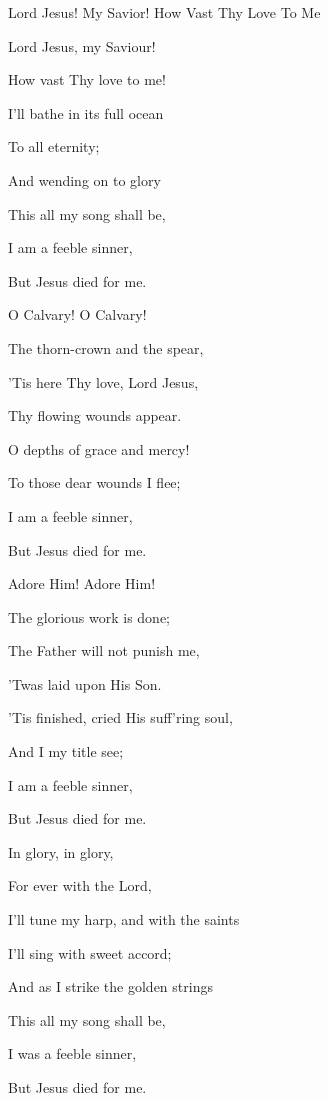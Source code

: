 \documentclass[12pt]{book}
\begin{document}
\begin{song}{Lord Jesus! My Savior! How Vast Thy Love To Me}{}
  {\SBPubDom}
  {}
  {}
  {}

  \begin{SBVerse}
    Lord Jesus, my Saviour!

    How vast Thy love to me!

    I'll bathe in its full ocean

    To all eternity;

    And wending on to glory

    This all my song shall be,

    I am a feeble sinner,

    But Jesus died for me.
  \end{SBVerse}

  \begin{SBVerse}
    O Calvary! O Calvary!

    The thorn-crown and the spear,

    'Tis here Thy love, Lord Jesus,

    Thy flowing wounds appear.

    O depths of grace and mercy!

    To those dear wounds I flee;

    I am a feeble sinner,

    But Jesus died for me.
  \end{SBVerse}

  \begin{SBVerse}
    Adore Him! Adore Him!

    The glorious work is done;

    The Father will not punish me,

    'Twas laid upon His Son.

    'Tis finished, cried His suff'ring soul,

    And I my title see;

    I am a feeble sinner,

    But Jesus died for me.
  \end{SBVerse}

  \begin{SBVerse}
    In glory, in glory,

    For ever with the Lord,

    I'll tune my harp, and with the saints

    I'll sing with sweet accord;

    And as I strike the golden strings

    This all my song shall be,

    I was a feeble sinner,

    But Jesus died for me.
  \end{SBVerse}
\end{song}
\end{document}
